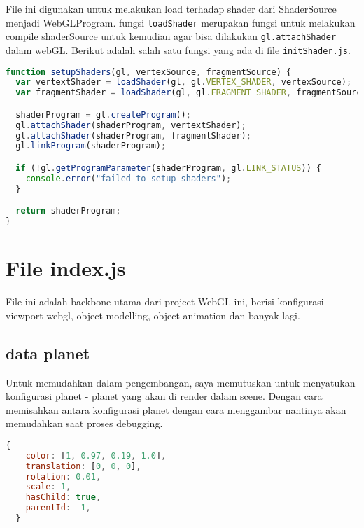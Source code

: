 File ini digunakan untuk melakukan load terhadap shader dari ShaderSource menjadi WebGLProgram. fungsi \texttt{loadShader} merupakan fungsi untuk melakukan compile shaderSource untuk kemudian agar bisa dilakukan \texttt{gl.attachShader} dalam webGL. Berikut adalah salah satu fungsi yang ada di file \texttt{initShader.js}.


\begin{lstlisting}[language=javascript, label={lst: setupShader}, caption={fungsi setupShader}]
function setupShaders(gl, vertexSource, fragmentSource) {
  var vertextShader = loadShader(gl, gl.VERTEX_SHADER, vertexSource);
  var fragmentShader = loadShader(gl, gl.FRAGMENT_SHADER, fragmentSource);

  shaderProgram = gl.createProgram();
  gl.attachShader(shaderProgram, vertextShader);
  gl.attachShader(shaderProgram, fragmentShader);
  gl.linkProgram(shaderProgram);

  if (!gl.getProgramParameter(shaderProgram, gl.LINK_STATUS)) {
    console.error("failed to setup shaders");
  }

  return shaderProgram;
}

\end{lstlisting}

\section{File index.js}

File ini adalah backbone utama dari project WebGL ini, berisi konfigurasi viewport webgl, object modelling, object animation dan banyak lagi.

\subsection*{data planet}

Untuk memudahkan dalam pengembangan, saya memutuskan untuk menyatukan konfigurasi planet - planet yang akan di render dalam scene. Dengan cara memisahkan antara konfigurasi planet dengan cara menggambar nantinya akan memudahkan saat proses debugging.

\begin{lstlisting}[language=javascript, label={lst: dataPlanet}, caption={list data planet}]
  {
    color: [1, 0.97, 0.19, 1.0],
    translation: [0, 0, 0],
    rotation: 0.01,
    scale: 1,
    hasChild: true,
    parentId: -1,
  }
  
\end{lstlisting}


